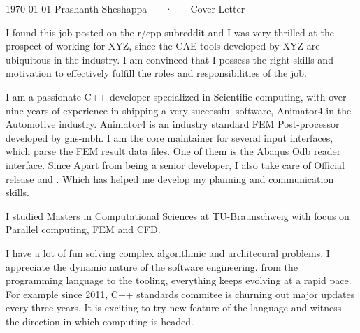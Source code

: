 \documentclass[11pt, a4paper]{awesome-cv}
\begin{document}
\makecvheader[R]

\makecvfooter
  {\today}
  {Prashanth Sheshappa ~~~·~~~ Cover Letter}
  {}

\makelettertitle

\begin{cvletter}


I found this job posted on the r/cpp subreddit and I was very thrilled at the prospect of working for XYZ, since
the CAE tools developed by XYZ are ubiquitous in the industry. 
I am convinced that I possess the right skills and motivation to effectively fulfill the roles and responsibilities of the job.
%     

I am a passionate C++ developer specialized in Scientific computing,  
with over nine years of experience in shipping a very successful software, Animator4 in the Automotive industry. 
Animator4 is an industry standard FEM Post-processor developed by gns-mbh.  
I am the core maintainer for several input interfaces, which parse the FEM result data files. 
One of them is the Abaqus Odb reader interface. Since  
Apart from being a senior developer, I also take care of Official release and . 
Which has helped me develop my planning and communication skills.

I studied Masters in Computational Sciences at TU-Braunschweig with focus on Parallel computing, FEM and CFD.

 



 



I have a lot of fun solving complex algorithmic and architecural problems. I appreciate the dynamic nature of the software engineering. from the programming language to the tooling, everything keeps evolving at a rapid pace. For example since 2011, C++ standards commitee is churning out major updates every three years. It is exciting to try new feature of the language and witness the direction in which computing is headed.




\end{cvletter}
\end{document}
